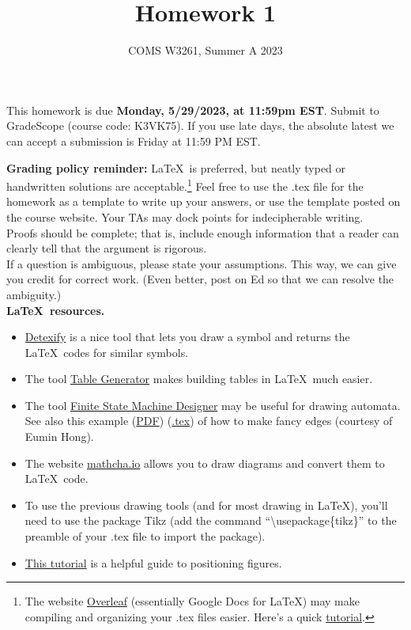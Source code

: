 \documentclass[letterpaper,11pt,twoside]{article}
\title{Homework 1}
\date{COMS W3261, Summer A 2023}
\theoremstyle{plain}
\theoremstyle{definition}
\theoremstyle{remark}
\theoremstyle{restate}
\begin{document}
\maketitle

This homework is due \textbf{Monday, 5/29/2023, at 11:59pm EST}. Submit to GradeScope (course code: K3VK75). If you use late days, the absolute latest we can accept a submission is Friday at 11:59 PM EST.

\textbf{Grading policy reminder:} \LaTeX~is preferred, but neatly typed or handwritten solutions are acceptable.\footnote{The website \href{https://www.overleaf.com/}{Overleaf} (essentially Google Docs for LaTeX) may make compiling and organizing your .tex files easier. Here's a quick \href{https://www.overleaf.com/learn/latex/Learn_LaTeX_in_30_minutes}{tutorial}.} Feel free to use the .tex file for the homework as a template to write up your answers, or use the template posted on the course website. Your TAs may dock points for indecipherable writing.\\

Proofs should be complete; that is, include enough information that a reader can clearly tell that the argument is rigorous. \\

If a question is ambiguous, please state your assumptions. This way, we can give you credit for correct work. (Even better, post on Ed so that we can resolve the ambiguity.) \\

\textbf{\LaTeX~resources.}
\begin{itemize}
    \item \href{https://detexify.kirelabs.org/classify.html}{Detexify} is a nice tool that lets you draw a symbol and returns the \LaTeX~codes for similar symbols. 
    \item The tool \href{https://www.tablesgenerator.com/}{Table Generator} makes building tables in \LaTeX~much easier.
    \item The tool \href{http://madebyevan.com/fsm/}{Finite State Machine Designer} may be useful for drawing automata. See also this example (\href{https://static.us.edusercontent.com/files/HZeTXimODzWeLvHIqsvjL2BG}{PDF}) (\href{https://static.us.edusercontent.com/files/RI3W8tQNvHMWFe9MkXV1KztA}{.tex}) of how to make fancy edges (courtesy of Eumin Hong).
    \item The website \href{https://www.mathcha.io/}{mathcha.io} allows you to draw diagrams and convert them to \LaTeX~code.
    \item To use the previous drawing tools (and for most drawing in \LaTeX), you'll need to use the package Tikz (add the command ``\textbackslash usepackage\{tikz\}'' to the preamble of your .tex file to import the package). 
    \item \href{https://www.overleaf.com/learn/latex/Positioning_of_Figures}{This tutorial} is a helpful guide to positioning figures.
\end{itemize}  
\end{document}
